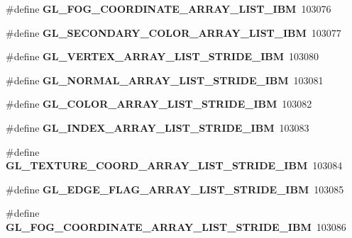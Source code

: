 \begin{DoxyCompactItemize}
\item 
\#define {\bfseries G\+L\+\_\+\+F\+O\+G\+\_\+\+C\+O\+O\+R\+D\+I\+N\+A\+T\+E\+\_\+\+A\+R\+R\+A\+Y\+\_\+\+L\+I\+S\+T\+\_\+\+I\+B\+M}~103076\label{_s_d_l__opengl_8h_adbaeded59bfc1cc920d0ee176722b389}

\item 
\#define {\bfseries G\+L\+\_\+\+S\+E\+C\+O\+N\+D\+A\+R\+Y\+\_\+\+C\+O\+L\+O\+R\+\_\+\+A\+R\+R\+A\+Y\+\_\+\+L\+I\+S\+T\+\_\+\+I\+B\+M}~103077\label{_s_d_l__opengl_8h_a88d1278170e87f5e41a833b3dfedc156}

\item 
\#define {\bfseries G\+L\+\_\+\+V\+E\+R\+T\+E\+X\+\_\+\+A\+R\+R\+A\+Y\+\_\+\+L\+I\+S\+T\+\_\+\+S\+T\+R\+I\+D\+E\+\_\+\+I\+B\+M}~103080\label{_s_d_l__opengl_8h_afe4a441260879aa79c6d9945bb9443dd}

\item 
\#define {\bfseries G\+L\+\_\+\+N\+O\+R\+M\+A\+L\+\_\+\+A\+R\+R\+A\+Y\+\_\+\+L\+I\+S\+T\+\_\+\+S\+T\+R\+I\+D\+E\+\_\+\+I\+B\+M}~103081\label{_s_d_l__opengl_8h_ab06062b6136558e835065c1763ee65af}

\item 
\#define {\bfseries G\+L\+\_\+\+C\+O\+L\+O\+R\+\_\+\+A\+R\+R\+A\+Y\+\_\+\+L\+I\+S\+T\+\_\+\+S\+T\+R\+I\+D\+E\+\_\+\+I\+B\+M}~103082\label{_s_d_l__opengl_8h_a9e485172931c748f3e7d7102abca1a65}

\item 
\#define {\bfseries G\+L\+\_\+\+I\+N\+D\+E\+X\+\_\+\+A\+R\+R\+A\+Y\+\_\+\+L\+I\+S\+T\+\_\+\+S\+T\+R\+I\+D\+E\+\_\+\+I\+B\+M}~103083\label{_s_d_l__opengl_8h_a5a2e1038ed023481d58b30d650f8a520}

\item 
\#define {\bfseries G\+L\+\_\+\+T\+E\+X\+T\+U\+R\+E\+\_\+\+C\+O\+O\+R\+D\+\_\+\+A\+R\+R\+A\+Y\+\_\+\+L\+I\+S\+T\+\_\+\+S\+T\+R\+I\+D\+E\+\_\+\+I\+B\+M}~103084\label{_s_d_l__opengl_8h_a7fa38c4c303ca929d72b40ff7ae38fea}

\item 
\#define {\bfseries G\+L\+\_\+\+E\+D\+G\+E\+\_\+\+F\+L\+A\+G\+\_\+\+A\+R\+R\+A\+Y\+\_\+\+L\+I\+S\+T\+\_\+\+S\+T\+R\+I\+D\+E\+\_\+\+I\+B\+M}~103085\label{_s_d_l__opengl_8h_af9ffd6f6619081acae2aad3104aeb41a}

\item 
\#define {\bfseries G\+L\+\_\+\+F\+O\+G\+\_\+\+C\+O\+O\+R\+D\+I\+N\+A\+T\+E\+\_\+\+A\+R\+R\+A\+Y\+\_\+\+L\+I\+S\+T\+\_\+\+S\+T\+R\+I\+D\+E\+\_\+\+I\+B\+M}~103086\label{_s_d_l__opengl_8h_a7f44ae93fd6b5f2025ef2d92799b1a3b}


\end{DoxyCompactItemize}
